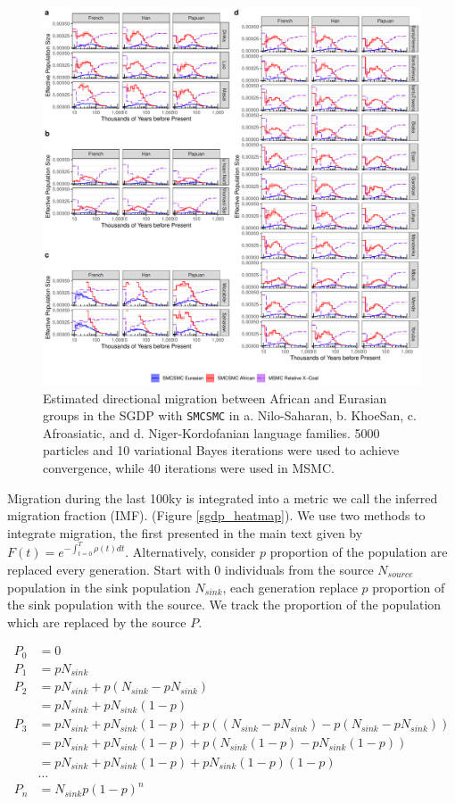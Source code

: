 \documentclass{article}
\begin{document}
\begin{figure}
	\centering
	\includegraphics[width=0.95\linewidth]{plot/sgdp_mig_new.pdf}
	\caption{Estimated directional migration between African and Eurasian groups in the SGDP with {\tt SMCSMC} in a. Nilo-Saharan, b. KhoeSan, c. Afroasiatic, and d. Niger-Kordofanian language families. 5000 particles and 10 variational Bayes iterations were used to achieve convergence, while 40 iterations were used in MSMC.}	
	\label{sgdp_mig}
\end{figure}

Migration during the last 100ky is integrated into a metric we call the inferred migration fraction (IMF). (Figure \ref{sgdp_heatmap}). We use two methods to integrate migration, the first presented in the main text given by $F(t) = e^{- \int_{t=0}^T \rho(t) dt}$. Alternatively, consider $p$ proportion of the population are replaced every generation. Start with 0 individuals from the source $N_{source}$ population in the sink population $N_{sink}$, each generation replace $p$ proportion of the sink population with the source. We track the proportion of the population which are replaced by the source $P$.  

$$ \begin{aligned} P_0 &= 0 \\ P_1 &= pN_{sink} \\ P_2 &= pN_{sink} + p(N_{sink} - pN_{sink}) \\ &= pN_{sink} + pN_{sink}(1-p) \\ P_3 &= pN_{sink} + pN_{sink}(1-p) + p((N_{sink}-pN_{sink}) - p(N_{sink}-pN_{sink})) \\ &= pN_{sink} + pN_{sink}(1-p)+p(N_{sink}(1-p)-pN_{sink}(1-p)) \\ &= pN_{sink}+pN_{sink}(1-p)+pN_{sink}(1-p)(1-p) \\ &\dots \\ P_n &=N_{sink}p(1-p)^n \end{aligned} $$
\end{document}
